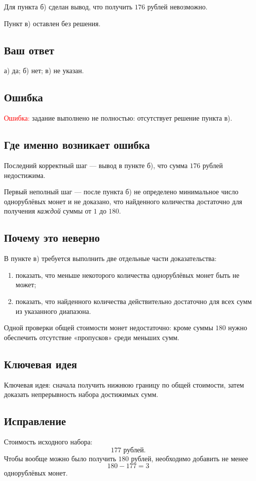 \documentclass[12pt,a4paper]{article}
\begin{document}
Для пункта б) сделан вывод, что получить $176$ рублей невозможно.

Пункт в) оставлен без решения.

\subsection*{Ваш ответ}
а) да; б) нет; в) не указан.

\subsection*{Ошибка}
\textcolor{red}{Ошибка:} задание выполнено не полностью: отсутствует решение пункта в).

\subsection*{Где именно возникает ошибка}
Последний корректный шаг --- вывод в пункте б), что сумма $176$ рублей недостижима.

Первый неполный шаг --- после пункта б) не определено минимальное число однорублёвых монет и не доказано, что найденного количества достаточно для получения \emph{каждой} суммы от $1$ до $180$.

\subsection*{Почему это неверно}
В пункте в) требуется выполнить две отдельные части доказательства:
\begin{enumerate}
  \item показать, что меньше некоторого количества однорублёвых монет быть не может;
  \item показать, что найденного количества действительно достаточно для всех сумм из указанного диапазона.
\end{enumerate}
Одной проверки общей стоимости монет недостаточно: кроме суммы $180$ нужно обеспечить отсутствие «пропусков» среди меньших сумм.

\subsection*{Ключевая идея}
\textcolor{blue!60!black}{Ключевая идея:} сначала получить нижнюю границу по общей стоимости, затем доказать непрерывность набора достижимых сумм.

\subsection*{Исправление}
Стоимость исходного набора:
\[
177\text{ рублей}.
\]
Чтобы вообще можно было получить $180$ рублей, необходимо добавить не менее
\[
180-177=3
\]
однорублёвых монет.
\end{document}

